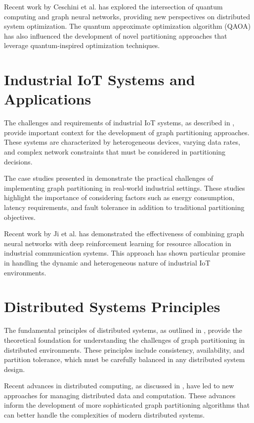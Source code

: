 Recent work by Ceschini et al. \cite{ceschini2024graphs} has explored the intersection of quantum computing and graph neural networks, providing new perspectives on distributed system optimization. The quantum approximate optimization algorithm (QAOA) \cite{farhi2014quantum} has also influenced the development of novel partitioning approaches that leverage quantum-inspired optimization techniques.

\section{Industrial IoT Systems and Applications}
The challenges and requirements of industrial IoT systems, as described in \cite{iot2023}, provide important context for the development of graph partitioning approaches. These systems are characterized by heterogeneous devices, varying data rates, and complex network constraints that must be considered in partitioning decisions.

The case studies presented in \cite{case2023} demonstrate the practical challenges of implementing graph partitioning in real-world industrial settings. These studies highlight the importance of considering factors such as energy consumption, latency requirements, and fault tolerance in addition to traditional partitioning objectives.

Recent work by Ji et al. \cite{ji2024graph} has demonstrated the effectiveness of combining graph neural networks with deep reinforcement learning for resource allocation in industrial communication systems. This approach has shown particular promise in handling the dynamic and heterogeneous nature of industrial IoT environments.

\section{Distributed Systems Principles}
The fundamental principles of distributed systems, as outlined in \cite{distributed2023}, provide the theoretical foundation for understanding the challenges of graph partitioning in distributed environments. These principles include consistency, availability, and partition tolerance, which must be carefully balanced in any distributed system design.

Recent advances in distributed computing, as discussed in \cite{conference2023}, have led to new approaches for managing distributed data and computation. These advances inform the development of more sophisticated graph partitioning algorithms that can better handle the complexities of modern distributed systems.

